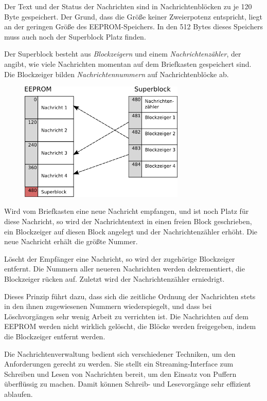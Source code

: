 \documentclass[ngerman]{article}
\begin{document}
Der Text und der Status der Nachrichten sind in
Nachrichtenblöcken zu je 120 Byte gespeichert. Der Grund, dass die
Größe keiner Zweierpotenz entspricht, liegt an der geringen Größe
des EEPROM-Speichers. In den 512 Bytes dieses Speichers muss auch
noch der Superblock Platz finden.

Der Superblock besteht aus \textit{Blockzeigern} und einem \textit{Nachrichtenzähler},
der angibt, wie viele Nachrichten momentan auf dem Briefkasten
gespeichert sind. Die Blockzeiger bilden \textit{Nachrichtennummern}
auf Nachrichtenblöcke ab.

\begin{figure}[h!] \begin{center}
    \includegraphics[width=0.7\textwidth]{media/eeprom}
\end{center} \end{figure}

Wird vom Briefkasten eine neue Nachricht  
empfangen, und ist noch Platz für diese Nachricht, so wird 
der Nachrichtentext in einen freien Block geschrieben,
ein Blockzeiger auf diesen Block angelegt und der Nachrichtenzähler
erhöht. Die neue Nachricht erhält die größte Nummer. 

Löscht der Empfänger eine Nachricht, so wird der zugehörige
Blockzeiger entfernt. Die Nummern aller neueren Nachrichten werden
dekrementiert, die Blockzeiger rücken auf. Zuletzt wird der
Nachrichtenzähler erniedrigt.

Dieses Prinzip führt dazu, dass sich die zeitliche Ordnung der
Nachrichten stets in den ihnen zugewiesenen Nummern wiederspiegelt,
und dass bei Löschvorgängen sehr wenig Arbeit zu verrichten ist. Die
Nachrichten auf dem EEPROM werden nicht wirklich gelöscht, die Blöcke
werden freigegeben, indem die Blockzeiger entfernt werden.

Die Nachrichtenverwaltung bedient sich verschiedener Techniken, um
den Anforderungen gerecht zu werden. Sie stellt ein Streaming-Interface
zum Schreiben und Lesen von Nachrichten bereit, um den Einsatz von
Puffern überflüssig zu machen. Damit können Schreib- und Lesevorgänge
sehr effizient ablaufen.
\end{document}
